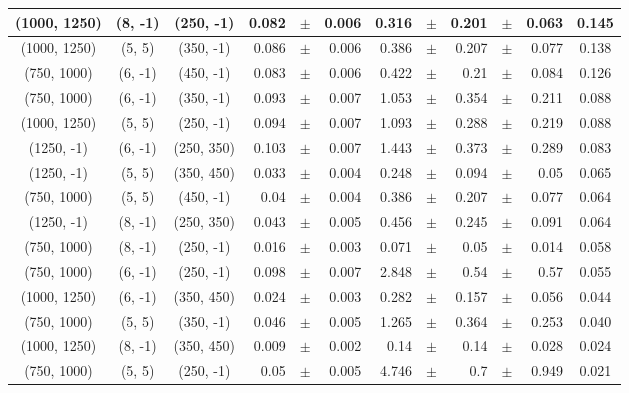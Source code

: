 \documentclass[12pt]{paper}
\begin{document}
\begin{table}[ht]
\begin{center}
{\begin{tabular}{|c|c|c|rrr|rrrrr|c|}
(1000, 1250)&(8, -1)&(250, -1)&0.082&$\pm$&0.006&0.316&$\pm$&0.201&$\pm$&0.063&0.145\\\hline
(1000, 1250)&(5, 5)&(350, -1)&0.086&$\pm$&0.006&0.386&$\pm$&0.207&$\pm$&0.077&0.138\\\hline
(750, 1000)&(6, -1)&(450, -1)&0.083&$\pm$&0.006&0.422&$\pm$&0.21&$\pm$&0.084&0.126\\\hline
(750, 1000)&(6, -1)&(350, -1)&0.093&$\pm$&0.007&1.053&$\pm$&0.354&$\pm$&0.211&0.088\\\hline
(1000, 1250)&(5, 5)&(250, -1)&0.094&$\pm$&0.007&1.093&$\pm$&0.288&$\pm$&0.219&0.088\\\hline
(1250, -1)&(6, -1)&(250, 350)&0.103&$\pm$&0.007&1.443&$\pm$&0.373&$\pm$&0.289&0.083\\\hline
(1250, -1)&(5, 5)&(350, 450)&0.033&$\pm$&0.004&0.248&$\pm$&0.094&$\pm$&0.05&0.065\\\hline
(750, 1000)&(5, 5)&(450, -1)&0.04&$\pm$&0.004&0.386&$\pm$&0.207&$\pm$&0.077&0.064\\\hline
(1250, -1)&(8, -1)&(250, 350)&0.043&$\pm$&0.005&0.456&$\pm$&0.245&$\pm$&0.091&0.064\\\hline
(750, 1000)&(8, -1)&(250, -1)&0.016&$\pm$&0.003&0.071&$\pm$&0.05&$\pm$&0.014&0.058\\\hline
(750, 1000)&(6, -1)&(250, -1)&0.098&$\pm$&0.007&2.848&$\pm$&0.54&$\pm$&0.57&0.055\\\hline
(1000, 1250)&(6, -1)&(350, 450)&0.024&$\pm$&0.003&0.282&$\pm$&0.157&$\pm$&0.056&0.044\\\hline
(750, 1000)&(5, 5)&(350, -1)&0.046&$\pm$&0.005&1.265&$\pm$&0.364&$\pm$&0.253&0.040\\\hline
(1000, 1250)&(8, -1)&(350, 450)&0.009&$\pm$&0.002&0.14&$\pm$&0.14&$\pm$&0.028&0.024\\\hline
(750, 1000)&(5, 5)&(250, -1)&0.05&$\pm$&0.005&4.746&$\pm$&0.7&$\pm$&0.949&0.021\\\hline

\end{tabular}}
\end{center}
\end{table}
\end{document}
